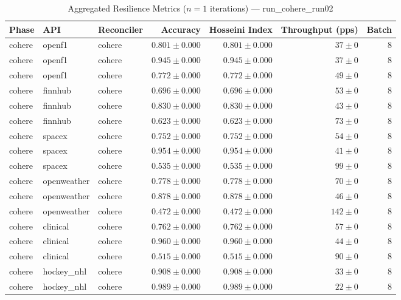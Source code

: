 
\begin{table}[htbp]
\caption{Aggregated Resilience Metrics ($n=1$ iterations) --- run_cohere_run02}
\begin{tabular}{l l l r r r r}
\hline
Phase & API & Reconciler & Accuracy & Hosseini Index & Throughput (pps) & Batch \\
\hline
cohere & openf1 & cohere & $0.801\pm0.000$ & $0.801\pm0.000$ & $37\pm0$ & 8 \\
cohere & openf1 & cohere & $0.945\pm0.000$ & $0.945\pm0.000$ & $37\pm0$ & 8 \\
cohere & openf1 & cohere & $0.772\pm0.000$ & $0.772\pm0.000$ & $49\pm0$ & 8 \\
cohere & finnhub & cohere & $0.696\pm0.000$ & $0.696\pm0.000$ & $53\pm0$ & 8 \\
cohere & finnhub & cohere & $0.830\pm0.000$ & $0.830\pm0.000$ & $43\pm0$ & 8 \\
cohere & finnhub & cohere & $0.623\pm0.000$ & $0.623\pm0.000$ & $73\pm0$ & 8 \\
cohere & spacex & cohere & $0.752\pm0.000$ & $0.752\pm0.000$ & $54\pm0$ & 8 \\
cohere & spacex & cohere & $0.954\pm0.000$ & $0.954\pm0.000$ & $41\pm0$ & 8 \\
cohere & spacex & cohere & $0.535\pm0.000$ & $0.535\pm0.000$ & $99\pm0$ & 8 \\
cohere & openweather & cohere & $0.778\pm0.000$ & $0.778\pm0.000$ & $70\pm0$ & 8 \\
cohere & openweather & cohere & $0.878\pm0.000$ & $0.878\pm0.000$ & $46\pm0$ & 8 \\
cohere & openweather & cohere & $0.472\pm0.000$ & $0.472\pm0.000$ & $142\pm0$ & 8 \\
cohere & clinical & cohere & $0.762\pm0.000$ & $0.762\pm0.000$ & $57\pm0$ & 8 \\
cohere & clinical & cohere & $0.960\pm0.000$ & $0.960\pm0.000$ & $44\pm0$ & 8 \\
cohere & clinical & cohere & $0.515\pm0.000$ & $0.515\pm0.000$ & $90\pm0$ & 8 \\
cohere & hockey\_nhl & cohere & $0.908\pm0.000$ & $0.908\pm0.000$ & $33\pm0$ & 8 \\
cohere & hockey\_nhl & cohere & $0.989\pm0.000$ & $0.989\pm0.000$ & $22\pm0$ & 8 \\

\end{tabular}
\end{table}
